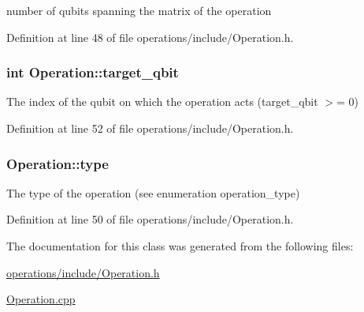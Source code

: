 number of qubits spanning the matrix of the operation 



Definition at line 48 of file operations/include/\+Operation.\+h.

\subsubsection[{\texorpdfstring{target\+\_\+qbit}{target_qbit}}]{\setlength{\rightskip}{0pt plus 5cm}int Operation\+::target\+\_\+qbit\hspace{0.3cm}{\ttfamily [protected]}}\hypertarget{class_operation_a3e489b72c124b494777c71b1646bb1e9}{}\label{class_operation_a3e489b72c124b494777c71b1646bb1e9}


The index of the qubit on which the operation acts (target\+\_\+qbit $>$= 0) 



Definition at line 52 of file operations/include/\+Operation.\+h.

\subsubsection[{\texorpdfstring{type}{type}}]{ Operation\+::type\hspace{0.3cm}{\ttfamily [protected]}}\hypertarget{class_operation_ad47c56c86d62a4c775571e1600416479}{}\label{class_operation_ad47c56c86d62a4c775571e1600416479}


The type of the operation (see enumeration operation\+\_\+type) 



Definition at line 50 of file operations/include/\+Operation.\+h.



The documentation for this class was generated from the following files\+:\begin{DoxyCompactItemize}
\item 
\hyperlink{operations_2include_2_operation_8h}{operations/include/\+Operation.\+h}\item 
\hyperlink{_operation_8cpp}{Operation.\+cpp}\end{DoxyCompactItemize}
